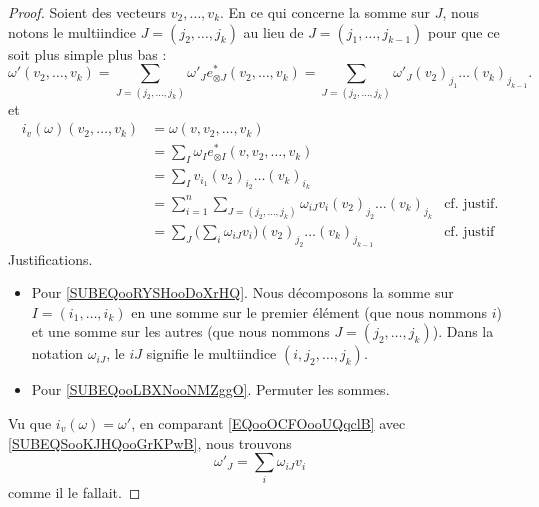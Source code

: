 \begin{proof}
	Soient des vecteurs \( v_2,\ldots,v_k\). En ce qui concerne la somme sur \( J\), nous notons le multiindice \( J=(j_2,\ldots,j_k)\) au lieu de \( J=(j_1,\ldots,j_{k-1})\) pour que ce soit plus simple plus bas :
	\begin{equation}		\label{EQooOCFOooUQqclB}
		\omega'(v_2,\ldots,v_k)=\sum_{J=(j_2,\ldots,j_{k})}\omega'_Je^*_{\otimes J}(v_2,\ldots,v_k)=\sum_{J=(j_2,\ldots,j_k)}\omega'_J(v_2)_{j_1}\ldots (v_k)_{j_{k-1}}.
	\end{equation}
	et
	\begin{subequations}		\label{SUBEQSooKJHQooGrKPwB}
		\begin{align}
			i_v(\omega)(v_2,\ldots,v_k) & = \omega(v,v_2,\ldots,v_k)                                                                                                          \\
			                            & = \sum_I\omega_Ie^*_{\otimes I}(v,v_2,\ldots,v_k)                                                                                   \\
			                            & = \sum_Iv_{i_1}(v_2)_{i_2}\ldots (v_k)_{i_k}                                                                                        \\
			                            & = \sum_{i=1}^n\sum_{J=(j_2,\ldots,j_k)}\omega_{iJ}v_i(v_2)_{j_2}\ldots (v_k)_{j_k} & \text{cf. justif.}	\label{SUBEQooRYSHooDoXrHQ} \\
			                            & = \sum_J\big( \sum_{i}\omega_{iJ}v_i \big)(v_2)_{j_2}\ldots (v_k)_{j_{k-1}}        & \text{cf. justif} \label{SUBEQooLBXNooNMZggO}
		\end{align}
	\end{subequations}
	Justifications.
	\begin{itemize}
		\item
		      Pour \eqref{SUBEQooRYSHooDoXrHQ}. Nous décomposons la somme sur \( I=(i_1,\ldots,i_k)\) en une somme sur le premier élément (que nous nommons \( i\)) et une somme sur les autres (que nous nommons \( J=(j_2,\ldots,j_k)\)). Dans la notation \( \omega_{iJ}\), le \( iJ\) signifie le multiindice \( (i, j_2,\ldots,j_k)\).
		\item
		      Pour \eqref{SUBEQooLBXNooNMZggO}. Permuter les sommes.
	\end{itemize}
	Vu que \( i_v(\omega)=\omega'\), en comparant \eqref{EQooOCFOooUQqclB} avec \eqref{SUBEQSooKJHQooGrKPwB}, nous trouvons
	\begin{equation}
		\omega'_J=\sum_i\omega_{iJ}v_i
	\end{equation}
	comme il le fallait.
\end{proof}


